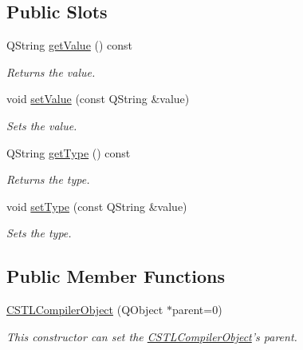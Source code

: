 \subsection*{Public Slots}
\begin{DoxyCompactItemize}
\item 
Q\+String \hyperlink{class_c_w_f_1_1_c_s_t_l_compiler_object_a92137c536b356e4f6eeb76a3c1b65e54}{get\+Value} () const 
\begin{DoxyCompactList}\small\item\em Returns the value. \end{DoxyCompactList}\item 
void \hyperlink{class_c_w_f_1_1_c_s_t_l_compiler_object_acf0a476bd687e47edb169c480193654f}{set\+Value} (const Q\+String \&value)
\begin{DoxyCompactList}\small\item\em Sets the value. \end{DoxyCompactList}\item 
Q\+String \hyperlink{class_c_w_f_1_1_c_s_t_l_compiler_object_ac7cd5fe07f3b71e0d4b6342db1a4cd29}{get\+Type} () const 
\begin{DoxyCompactList}\small\item\em Returns the type. \end{DoxyCompactList}\item 
void \hyperlink{class_c_w_f_1_1_c_s_t_l_compiler_object_a51e99c46daee9cb1f14088d69d2d4e0e}{set\+Type} (const Q\+String \&value)
\begin{DoxyCompactList}\small\item\em Sets the type. \end{DoxyCompactList}\end{DoxyCompactItemize}
\subsection*{Public Member Functions}
\begin{DoxyCompactItemize}
\item 
\hyperlink{class_c_w_f_1_1_c_s_t_l_compiler_object_a1c20bd083beceaaef00fcaf10f9e061c}{C\+S\+T\+L\+Compiler\+Object} (Q\+Object $\ast$parent=0)
\begin{DoxyCompactList}\small\item\em This constructor can set the \hyperlink{class_c_w_f_1_1_c_s_t_l_compiler_object}{C\+S\+T\+L\+Compiler\+Object}'s parent. \end{DoxyCompactList}\end{DoxyCompactItemize}


